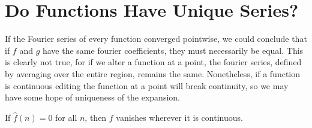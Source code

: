 \section{Do Functions Have Unique Series?}

If the Fourier series of every function converged pointwise, we could conclude that if $f$ and $g$ have the same fourier coefficients, they must necessarily be equal. This is clearly not true, for if we alter a function at a point, the fourier series, defined by averaging over the entire region, remains the same. Nonetheless, if a function is continuous editing the function at a point will break continuity, so we may have some hope of uniqueness of the expansion.

\begin{theorem}
    If $\hat{f}(n) = 0$ for all $n$, then $f$ vanishes wherever it is continuous.
\end{theorem}
